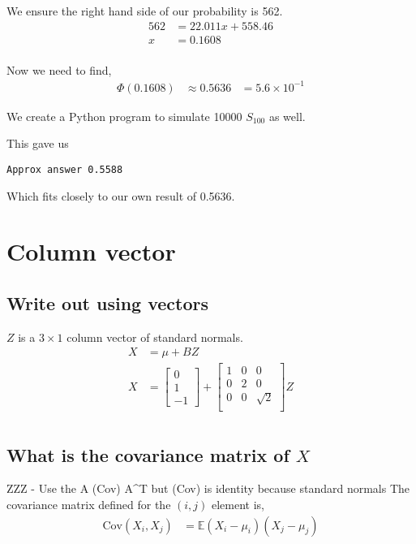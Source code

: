 \documentclass{article}
\newcommand{\expect}{\mathbb{E}}
\begin{document}
We ensure the right hand side of our probability is 562.
\begin{align*}
    562 &= 22.011 x + 558.46 \\
    x &= 0.1608 \\
\end{align*}

Now we need to find,
\begin{align*}
    \Phi(0.1608) &\approx 0.5636
    &= 5.6 \times 10^{-1}
\end{align*}

We create a Python program to simulate 10000 $S_{100}$ as well.


This gave us
\begin{verbatim}
Approx answer 0.5588
\end{verbatim}

Which fits closely to our own result of 0.5636.

\section{Column vector}
\subsection{Write out using vectors}
$Z$ is a $3\times1$ column vector of standard normals.
\begin{align*}
    X &= \mu + BZ \\
    X
    &=
    \begin{bmatrix}
        0 \\ 1 \\ -1
    \end{bmatrix}
    +
    \begin{bmatrix}
        1 & 0 & 0 \\
        0 & 2 & 0 \\
        0 & 0 & \sqrt{2} \\
    \end{bmatrix}
    Z \\
\end{align*}

\subsection{What is the covariance matrix of $X$}
ZZZ - Use the A (Cov) A^T but (Cov) is identity because standard normals
The covariance matrix defined for the $(i,j)$ element is,
\begin{align*}
    \text{Cov}(X_i,X_j) & = \expect (X_i - \mu_i)(X_j - \mu_j) \\
\end{align*}
\end{document}
